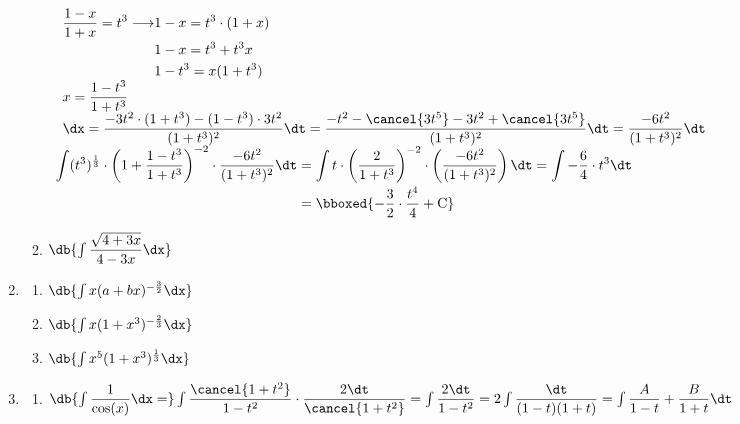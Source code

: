 \begin{enumerate}[label=\color{red}\textbf{\arabic*)}, leftmargin=*]
\begin{enumerate}[label=\color{red}\alph*)]
            $\begin{array}{l}
                  \begin{array}{l}
                  \begin{aligned}
                        \dfrac{1-x}{1+x}=t^3\longrightarrow&1-x=t^3\cdot(1+x)\\
                        &1-x=t^3+t^3x\\
                        &1-t^3=x(1+t^3)\\
                  \end{aligned}\\
                  x=\dfrac{1-t^3}{1+t^3} \\
                        \dx=\dfrac{-3t^2\cdot(1+t^3)-(1-t^3)\cdot3t^2}{(1+t^3)^2}\dt=\dfrac{-t^2-\cancel{3t^5}-3t^2+\cancel{3t^5}}{(1+t^3)^2}\dt=\dfrac{-6t^2}{(1+t^3)^2}\dt
            \end{array}\\
            \begin{aligned}
                  \int(t^3)^{\frac{1}{3}}\cdot\left(1+\dfrac{1-t^3}{1+t^3}\right)^{-2}\cdot\dfrac{-6t^2}{(1+t^3)^2}\dt&=\int t\cdot\left(\dfrac{2}{1+t^3}\right)^{-2}\cdot\left(\dfrac{-6t^2}{(1+t^3)^2}\right)\dt=\int-\dfrac{6}{4}\cdot t^3\dt\\
                  &=\bboxed{-\dfrac{3}{2}\cdot\dfrac{t^4}{4}+\mathrm{C}}
            \end{aligned}
            \end{array}$
		\item $\db{\int\dfrac{\sqrt{4+3x}}{4-3x}\dx}$
	\end{enumerate}
	\item {}
	\begin{enumerate}[label=\color{red}\alph*)]
		\item $\db{\int x(a+bx)^{-\frac{3}{2}}\dx}$
		\item $\db{\int x(1+x^3)^{-\frac{2}{3}}\dx}$
		\item $\db{\int x^5(1+x^3)^{\frac{1}{3}}\dx}$
	\end{enumerate}
	\item {}
	\begin{enumerate}[label=\color{red}\alph*)]
		\item $\db{\int\dfrac{1}{\cos(x)}\dx=}\int\dfrac{\cancel{1+t^2}}{1-t^2}\cdot\dfrac{2\dt}{\cancel{1+t^2}}=\int\dfrac{2\dt}{1-t^2}=2\int\dfrac{\dt}{(1-t)(1+t)}=\int\dfrac{A}{1-t}+\dfrac{B}{1+t}\dt$
            

\end{enumerate}
\end{enumerate}
